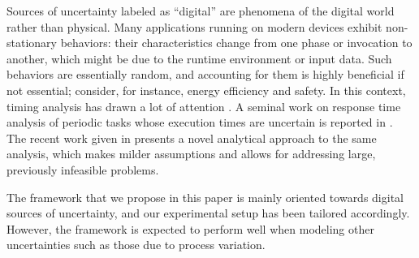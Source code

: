 Sources of uncertainty labeled as ``digital'' are phenomena of the digital world
rather than physical. Many applications running on modern devices exhibit
non-stationary behaviors: their characteristics change from one phase or
invocation to another, which might be due to the runtime environment or input
data. Such behaviors are essentially random, and accounting for them is highly
beneficial if not essential; consider, for instance, energy efficiency and
safety. In this context, timing analysis has drawn a lot of attention
\cite{quinton2012}. A seminal work on response time analysis of periodic tasks
whose execution times are uncertain is reported in \cite{diaz2002}. The recent
work given in \cite{tanasa2015} presents a novel analytical approach to the same
analysis, which makes milder assumptions and allows for addressing large,
previously infeasible problems.

The framework that we propose in this paper is mainly oriented towards digital
sources of uncertainty, and our experimental setup has been tailored
accordingly. However, the framework is expected to perform well when modeling
other uncertainties such as those due to process variation.
